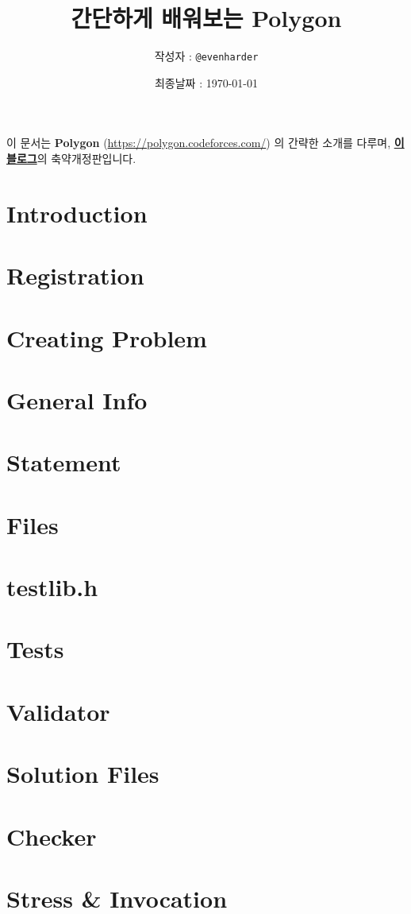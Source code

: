 \documentclass{article}
\title{간단하게 배워보는 Polygon}
\author{작성자 : \texttt{@evenharder}}
\date{최종날짜 : \today}
\begin{document}
    \maketitle
    이 문서는 \textbf{Polygon} (\url{https://polygon.codeforces.com/}) 의 간략한 소개를 다루며, {\color{blue}\textbf{\href{http://evenharder.tistory.com}{이 블로그}}}의 축약개정판입니다.
    \tableofcontents
    \newpage
    \section{Introduction}
    
    \section{Registration}
    
    \section{Creating Problem}
    
    \section{General Info}
    
    \section{Statement}
    
    \section{Files}
    
    \section{testlib.h}
    
    \section{Tests}
    
    \section{Validator}
    
    \section{Solution Files}
    
    \section{Checker}
    
    \section{Stress \& Invocation}
    
\end{document}
